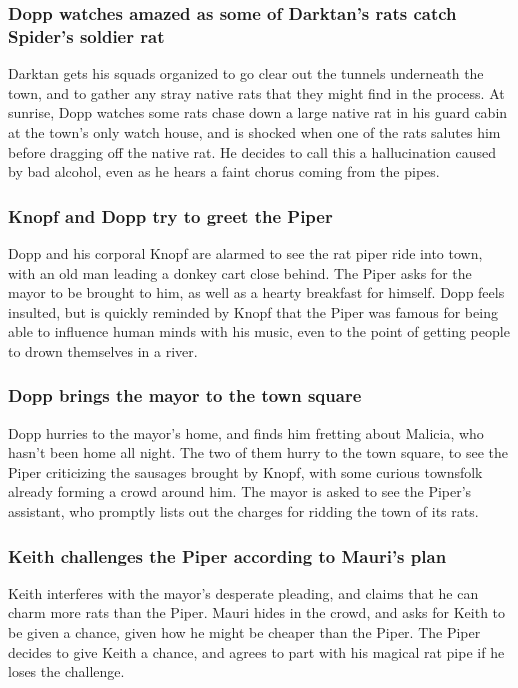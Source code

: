 \subsubsection{\Gls{Dopp} watches amazed as some of \Gls{Darktan}'s rats catch \Gls{Spider}'s
    soldier rat}
\Gls{Darktan} gets his squads organized to go clear out the tunnels underneath the town, and to
gather any stray native rats that they might find in the process. At sunrise, \Gls{Dopp} watches
some rats chase down a large native rat in his guard cabin at the town's only watch house, and
is shocked when one of the rats salutes him before dragging off the native rat. He decides to call
this a hallucination caused by bad alcohol, even as he hears a faint chorus coming from the pipes.

\subsubsection{\Gls{Knopf} and \Gls{Dopp} try to greet the \Gls{Piper}}
\Gls{Dopp} and his corporal \Gls{Knopf} are alarmed to see the rat piper ride into town, with an
old man leading a donkey cart close behind. The \Gls{Piper} asks for the mayor to be brought to him,
as well as a hearty breakfast for himself. \Gls{Dopp} feels insulted, but is quickly reminded by
\Gls{Knopf} that the \Gls{Piper} was famous for being able to influence human minds with his music,
even to the point of getting people to drown themselves in a river.

\subsubsection{\Gls{Dopp} brings the mayor to the town square}
\Gls{Dopp} hurries to the mayor's home, and finds him fretting about \Gls{Malicia}, who hasn't been
home all night. The two of them hurry to the town square, to see the \Gls{Piper} criticizing the
sausages brought by \Gls{Knopf}, with some curious townsfolk already forming a crowd around him.
The mayor is asked to see the \Gls{Piper}'s assistant, who promptly lists out the charges for
ridding the town of its rats.

\subsubsection{\Gls{Keith} challenges the \Gls{Piper} according to \Gls{Mauri}'s plan}
\Gls{Keith} interferes with the mayor's desperate pleading, and claims that he can charm more rats
than the \Gls{Piper}. \Gls{Mauri} hides in the crowd, and asks for \Gls{Keith} to be given a chance,
given how he might be cheaper than the \Gls{Piper}. The \Gls{Piper} decides to give \Gls{Keith} a
chance, and agrees to part with his magical rat pipe if he loses the challenge.

